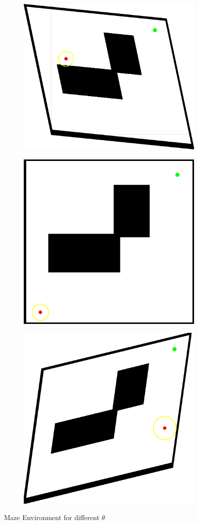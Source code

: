 \begin{figure}[H]
    \centering
    \begin{subfigure}{0.45\textwidth}
        \centering
        \includegraphics[width=0.6\linewidth]{images/maze_0.9_-0.17_-0.09_0.82.png}
    \end{subfigure}
    \hfill
    \begin{subfigure}{0.45\textwidth}
        \centering
        \includegraphics[width=0.6\linewidth]{images/maze_1.png}
    \end{subfigure}
    \hfill
    \begin{subfigure}{0.45\textwidth}
        \centering
        \includegraphics[width=0.6\linewidth]{images/maze_0.62_0.07_0.15_0.56.png}
    \end{subfigure}
    \caption{Maze Environment for different $\theta$}
    \label{fig:mazenv}
\end{figure}

